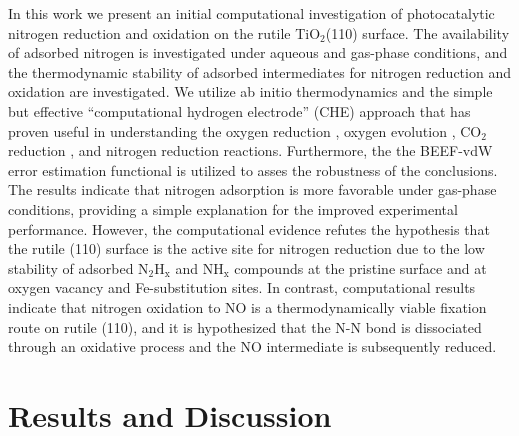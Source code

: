 \documentclass[journal=ascecg,manuscript=article,articletitle=true]{achemso}
\begin{document}
In this work we present an initial computational investigation of photocatalytic nitrogen reduction and oxidation on the rutile TiO$_2$(110) surface. The availability of adsorbed nitrogen is investigated under aqueous and gas-phase conditions, and the thermodynamic stability of adsorbed intermediates for nitrogen reduction and oxidation are investigated. We utilize ab initio thermodynamics \cite{Reuter_2001,Reuter_2005} and the simple but effective ``computational hydrogen electrode'' (CHE) approach \cite{Calle_Vallejo_2012} that has proven useful in understanding the oxygen reduction \cite{Norskov_2004}, oxygen evolution \cite{Man_2011}, CO$_2$ reduction \cite{Peterson_2010}, and nitrogen reduction \cite{Skulason_2012} reactions. Furthermore, the the BEEF-vdW error estimation functional is utilized to asses the robustness of the conclusions. The results indicate that nitrogen adsorption is more favorable under gas-phase conditions, providing a simple explanation for the improved experimental performance. However, the computational evidence refutes the hypothesis that the rutile (110) surface is the active site for nitrogen reduction due to the low stability of adsorbed N$_2$H$_{\mathrm{x}}$ and NH$_{\mathrm{x}}$ compounds at the pristine surface and at oxygen vacancy and Fe-substitution sites. In contrast, computational results indicate that nitrogen oxidation to NO is a thermodynamically viable fixation route on rutile (110), and it is hypothesized that the N-N bond is dissociated through an oxidative process and the NO intermediate is subsequently reduced.

\section{Results and Discussion}
\end{document}
